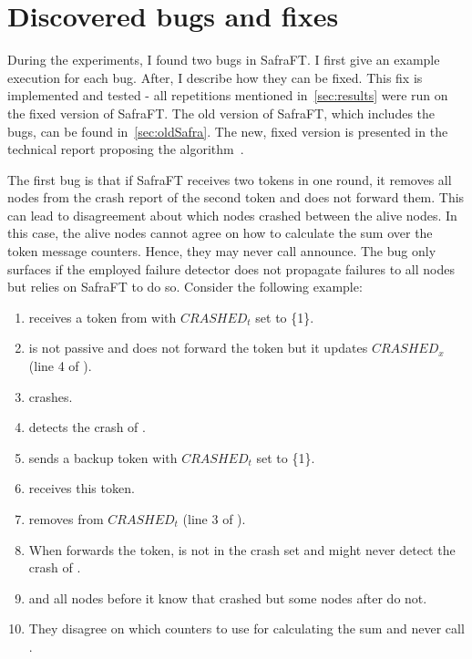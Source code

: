 \section{Discovered bugs and fixes}
\label{sec:safraBugs}

During the experiments, I found two bugs in SafraFT.
I first give an example execution for each bug.
After, I describe how they can be fixed.
This fix is implemented and tested - all repetitions mentioned in~\cref{sec:results} were run on the fixed version of SafraFT.
The old version of SafraFT, which includes the bugs, can be found in~\cref{sec:oldSafra}.
The new, fixed version is presented in the technical report proposing the algorithm~\cite{safraFT2018}.

The first bug is that if SafraFT receives two tokens in one round, it removes all nodes from the crash report of the second token and does not forward them.
This can lead to disagreement about which nodes crashed between the alive nodes.
In this case, the alive nodes cannot agree on how to calculate the sum over the token message counters.
Hence, they may never call announce.
The bug only surfaces if the employed failure detector does not propagate failures to all nodes but relies on SafraFT to do so.
Consider the following example:

\begin{enumerate}
	\item {} receives a token from  with $CRASHED_t$ set to \{1\}.
	\item {} is not passive and does not forward the token but it updates $CRASHED_x$ (line 4 of ).
	\item {} crashes.
	\item {} detects the crash of .
	\item {} sends a backup token with $CRASHED_t$ set to \{1\}.
	\item {} receives this token.
	\item {} removes  from $CRASHED_t$ (line 3 of ).
	\item When  forwards the token,  is not in the crash set and  might never detect the crash of .
	\item {} and all nodes before it know that  crashed but some nodes after  do not.
	\item They disagree on which counters to use for calculating the sum and never call .
\end{enumerate}

